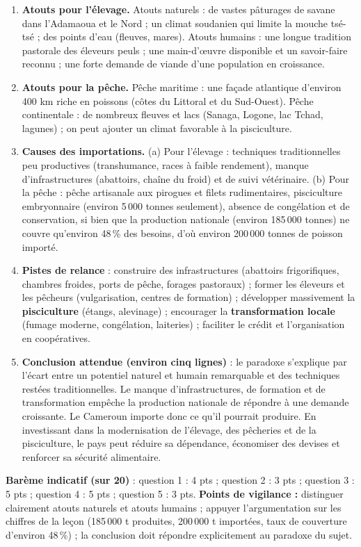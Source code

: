 \documentclass[11pt]{article}
\begin{document}
\begin{corrige}
\begin{enumerate}
\item \textbf{Atouts pour l'élevage.} Atouts naturels : de vastes pâturages de savane dans l'Adamaoua et le Nord ; un climat soudanien qui limite la mouche tsé-tsé ; des points d'eau (fleuves, mares). Atouts humains : une longue tradition pastorale des éleveurs peuls ; une main-d'œuvre disponible et un savoir-faire reconnu ; une forte demande de viande d'une population en croissance.
\item \textbf{Atouts pour la pêche.} Pêche maritime : une façade atlantique d'environ 400 km riche en poissons (côtes du Littoral et du Sud-Ouest). Pêche continentale : de nombreux fleuves et lacs (Sanaga, Logone, lac Tchad, lagunes) ; on peut ajouter un climat favorable à la pisciculture.
\item \textbf{Causes des importations.} (a) Pour l'élevage : techniques traditionnelles peu productives (transhumance, races à faible rendement), manque d'infrastructures (abattoirs, chaîne du froid) et de suivi vétérinaire. (b) Pour la pêche : pêche artisanale aux pirogues et filets rudimentaires, pisciculture embryonnaire (environ 5\,000 tonnes seulement), absence de congélation et de conservation, si bien que la production nationale (environ 185\,000 tonnes) ne couvre qu'environ 48\,\% des besoins, d'où environ 200\,000 tonnes de poisson importé.
\item \textbf{Pistes de relance} : construire des infrastructures (abattoirs frigorifiques, chambres froides, ports de pêche, forages pastoraux) ; former les éleveurs et les pêcheurs (vulgarisation, centres de formation) ; développer massivement la \textbf{pisciculture} (étangs, alevinage) ; encourager la \textbf{transformation locale} (fumage moderne, congélation, laiteries) ; faciliter le crédit et l'organisation en coopératives.
\item \textbf{Conclusion attendue (environ cinq lignes)} : le paradoxe s'explique par l'écart entre un potentiel naturel et humain remarquable et des techniques restées traditionnelles. Le manque d'infrastructures, de formation et de transformation empêche la production nationale de répondre à une demande croissante. Le Cameroun importe donc ce qu'il pourrait produire. En investissant dans la modernisation de l'élevage, des pêcheries et de la pisciculture, le pays peut réduire sa dépendance, économiser des devises et renforcer sa sécurité alimentaire.
\end{enumerate}
\textbf{Barème indicatif (sur 20)} : question 1 : 4 pts ; question 2 : 3 pts ; question 3 : 5 pts ; question 4 : 5 pts ; question 5 : 3 pts.
\textbf{Points de vigilance :} distinguer clairement atouts naturels et atouts humains ; appuyer l'argumentation sur les chiffres de la leçon (185\,000 t produites, 200\,000 t importées, taux de couverture d'environ 48\,\%) ; la conclusion doit répondre explicitement au paradoxe du sujet.
\end{corrige}
\end{document}
